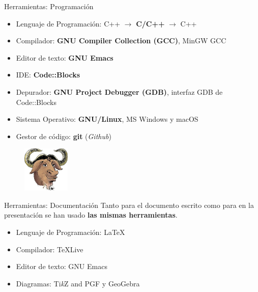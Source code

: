 \documentclass{beamer}
\begin{document}
\begin{frame}{Herramientas: Programación}
  \begin{itemize}
  \item{Lenguaje de Programación: C++ $\rightarrow$ \textbf{C/C++} $\rightarrow$ C++}
  \item{Compilador: \textbf{GNU Compiler Collection (GCC)}, MinGW GCC}
  \item{Editor de texto: \textbf{GNU Emacs}}
  \item{IDE: \textbf{Code::Blocks}}
  \item{Depurador: \textbf{GNU Project Debugger (GDB)}, interfaz GDB de Code::Blocks}
  \item{Sistema Operativo: \textbf{GNU/Linux}, MS Windows y macOS}
  \item{Gestor de código: \textbf{git} (\textit{Github})}
  \end{itemize}
  \begin{figure} [h]
    \centering
    \includegraphics[width=0.2\textwidth]{img/reiss-head}
  \end{figure}
\end{frame}

\begin{frame}{Herramientas: Documentación}
  Tanto para el documento escrito como para en la presentación se han usado \textbf{las mismas herramientas}.
  \begin{itemize}
  \item{Lenguaje de Programación: \textrm{\LaTeX}}
  \item{Compilador: \textrm{\TeX  Live}}
  \item{Editor de texto: GNU Emacs}
  \item{Diagramas: Ti\textit{k}Z and PGF y GeoGebra}
  \end{itemize}
\end{frame}
\end{document}
